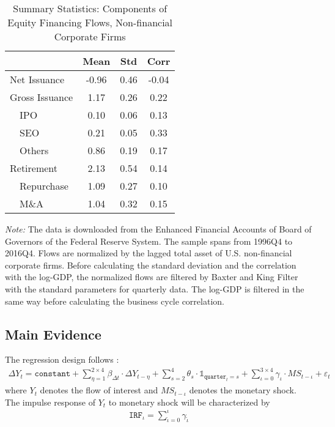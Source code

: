 \documentclass[11pt]{article}
\newcommand{\sumComp}[3]{\sum_{#1=#2}^{#3}}
\begin{document}
\begin{table}[htbp]
	\centering
	\caption{Summary Statistics: Components of Equity Financing Flows, Non-financial Corporate Firms}
	\begin{tabular}{lccc}
		\toprule[1.5pt]
		& Mean  & Std   & Corr \\
		\midrule
		Net Issuance & -0.96 & 0.46  & -0.04 \\[1em]
		Gross Issuance & 1.17  & 0.26  & 0.22 \\
		\ \ IPO & 0.10  & 0.06  & 0.13 \\
		\ \ SEO & 0.21  & 0.05  & 0.33 \\
		\ \ Others & 0.86  & 0.19  & 0.17 \\[1em]
		Retirement & 2.13  & 0.54  & 0.14 \\
		\ \ Repurchase & 1.09  & 0.27  & 0.10 \\
		\ \ M\&A & 1.04  & 0.32  & 0.15 \\
	\bottomrule[1.5pt]
	\end{tabular}%
	\flushleft
	\textit{Note:} {\footnotesize The data is downloaded from the Enhanced Financial Accounts of Board of Governors of the Federal Reserve System. The sample spans from 1996Q4 to 2016Q4.  Flows are normalized by the lagged total asset of U.S. non-financial corporate firms. Before calculating the standard deviation and the correlation with the log-GDP, the normalized flows are filtered by Baxter and King Filter with the standard parameters for quarterly data. The log-GDP is filtered in the same way before calculating the business cycle correlation. }
\end{table}%
\subsection{Main Evidence}
The regression design follows \cite{RomerRomer:AER:2004}:
\begin{align}
\Delta Y_{t}=\texttt{constant}+\sumComp{\eta}{1}{2\times 4} \beta_{\Delta t}\cdot \Delta Y_{t-\eta}+\sumComp{s}{2}{4} \theta_{s}\cdot \mathds{1}_{\texttt{quarter}_{t}=s}+\sumComp{\iota}{0}{3\times 4} \gamma_{\iota}\cdot MS_{t-\iota}+\varepsilon_{t}
\end{align}
where $ Y_{t} $ denotes the flow of interest and $ MS_{t-\iota} $ denotes the monetary shock. The impulse response of $ Y_{t} $ to monetary shock will be characterized by 
\begin{align}
\texttt{IRF}_{\iota}=\sumComp{\tilde{\iota}}{0}{\iota} \gamma_{\tilde{\iota}}
\end{align}
\end{document}
